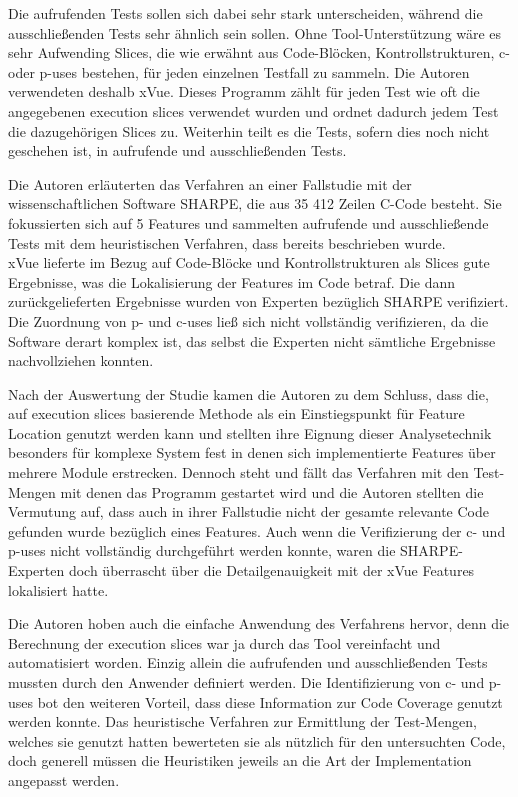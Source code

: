 \documentclass[runningheads,a4paper]{llncs}
\begin{document}
Die aufrufenden Tests sollen sich dabei sehr stark unterscheiden, während die ausschließenden Tests sehr ähnlich sein sollen. Ohne Tool-Unterstützung wäre es sehr Aufwending Slices, die wie erwähnt aus Code-Blöcken, Kontrollstrukturen, c- oder p-uses bestehen, für jeden einzelnen Testfall zu sammeln. Die Autoren verwendeten deshalb xVue. Dieses Programm zählt für jeden Test wie oft die angegebenen execution slices verwendet wurden und ordnet dadurch jedem Test die dazugehörigen Slices zu. Weiterhin teilt es die Tests, sofern dies noch nicht geschehen ist, in aufrufende und ausschließenden Tests.

Die Autoren erläuterten das Verfahren an einer Fallstudie mit der wissenschaftlichen Software SHARPE, die aus 35 412 Zeilen C-Code besteht. Sie fokussierten sich auf 5 Features und sammelten aufrufende und ausschließende Tests mit dem heuristischen Verfahren, dass bereits beschrieben wurde. \\xVue lieferte im Bezug auf Code-Blöcke und Kontrollstrukturen als Slices gute Ergebnisse, was die Lokalisierung der Features im Code betraf. Die dann zurückgelieferten Ergebnisse wurden von Experten bezüglich SHARPE verifiziert. Die Zuordnung von p- und c-uses ließ sich nicht vollständig verifizieren, da die Software derart komplex ist, das selbst die Experten nicht sämtliche Ergebnisse nachvollziehen konnten.

Nach der Auswertung der Studie kamen die Autoren zu dem Schluss, dass die, auf
execution slices basierende Methode als ein Einstiegspunkt für Feature Location genutzt werden kann und stellten ihre Eignung dieser Analysetechnik besonders für komplexe System fest in denen sich implementierte Features über mehrere Module erstrecken. Dennoch steht und fällt das Verfahren mit den Test-Mengen mit denen das Programm gestartet wird und die Autoren stellten die Vermutung auf, dass auch in ihrer Fallstudie nicht der gesamte relevante Code gefunden wurde bezüglich eines Features. Auch wenn die Verifizierung der c- und p-uses nicht vollständig durchgeführt werden konnte, waren die SHARPE-Experten doch überrascht über die Detailgenauigkeit mit der xVue Features lokalisiert hatte.

Die Autoren hoben auch die einfache Anwendung des Verfahrens hervor, denn die Berechnung der execution slices war ja durch das Tool vereinfacht und automatisiert worden. Einzig allein die aufrufenden und ausschließenden Tests mussten durch den Anwender definiert werden. Die Identifizierung von c- und p-uses bot den weiteren Vorteil, dass diese Information zur Code Coverage genutzt werden konnte. Das heuristische Verfahren zur Ermittlung der Test-Mengen, welches sie genutzt hatten bewerteten sie als nützlich für den untersuchten Code, doch generell müssen die Heuristiken jeweils an die Art der Implementation angepasst werden.
\end{document}
